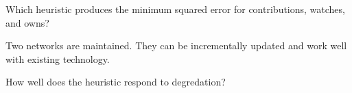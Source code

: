 Which heuristic produces the minimum squared error for contributions, watches, and owns?

Two networks are maintained. They can be incrementally updated and work well with existing technology.

How well does the heuristic respond to degredation?

